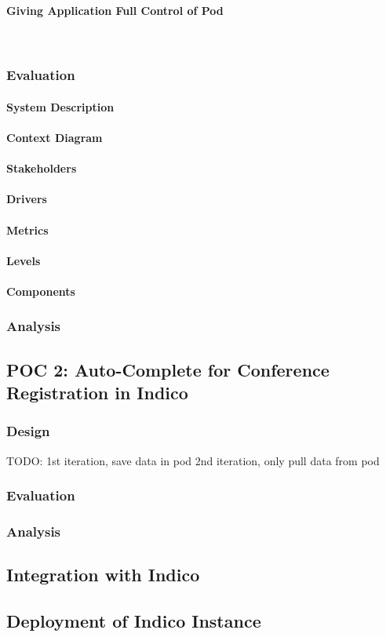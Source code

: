 \paragraph{Giving Application Full Control of Pod}\mbox{}\\

\subsubsection{Evaluation}

\paragraph{System Description}
\paragraph{Context Diagram}
\paragraph{Stakeholders}
\paragraph{Drivers}
\paragraph{Metrics}
\paragraph{Levels}
\paragraph{Components}

\subsubsection{Analysis}

\subsection{POC 2: Auto-Complete for Conference Registration in Indico}

\subsubsection{Design}

TODO:
1st iteration, save data in pod
2nd iteration, only pull data from pod



\subsubsection{Evaluation}
\subsubsection{Analysis}

\subsection{Integration with Indico}

\subsection{Deployment of Indico Instance}
